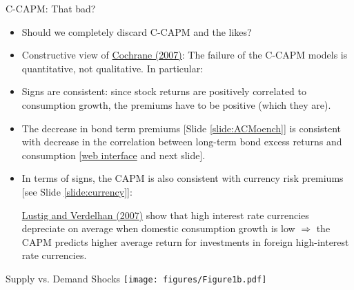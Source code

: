\begin{frame}{C-CAPM: That bad?}
\begin{footnotesize}
\begin{itemize}
	\item {\color{blue}Should we completely discard C-CAPM and the likes?}
	\item Constructive view of \href{http://faculty.chicagobooth.edu/john.cochrane/research/papers/financial_and_real_proofs_aug_07.pdf}{Cochrane (2007)}: The failure of the C-CAPM models is quantitative, not qualitative. In particular:
		\item[a.] Signs are consistent: since stock returns are positively correlated to consumption growth, the premiums have to be positive (which they are).
		\item[b.] The decrease in bond term premiums [Slide \ref{slide:ACMoench}] is consistent with decrease in the correlation between long-term bond excess returns and consumption [\href{https://jrenne.shinyapps.io/APModels}{web interface} and next slide].
		\item[c.] In terms of signs, the CAPM is also consistent with currency risk premiums [see Slide \ref{slide:currency}]:
		
		\href{http://web.mit.edu/adrienv/www/FX_Xsection.pdf}{Lustig and Verdelhan (2007)} show that high interest rate currencies depreciate on average when domestic consumption growth is low $\Rightarrow$ the CAPM predicts higher average return for investments in foreign high-interest rate currencies.
\end{itemize}
\end{footnotesize}
\end{frame}


\begin{frame}{Supply vs. Demand Shocks}
		\texttt{[image: figures/Figure1b.pdf]}
\end{frame}








